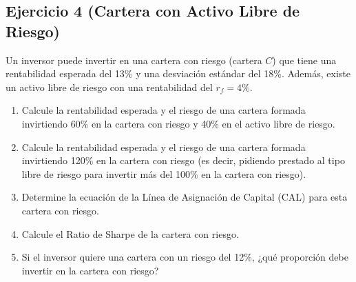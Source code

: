 \documentclass[12pt,a4paper]{article}
\newenvironment{ejercicio}[1]{\subsection*{Ejercicio #1}}{}
\begin{document}
\begin{ejercicio}{4 (Cartera con Activo Libre de Riesgo)}
Un inversor puede invertir en una cartera con riesgo (cartera $C$) que tiene una rentabilidad esperada del 13\% y una desviación estándar del 18\%. Además, existe un activo libre de riesgo con una rentabilidad del $r_f = 4\%$.

\begin{enumerate}[label=\alph*)]
  \item Calcule la rentabilidad esperada y el riesgo de una cartera formada invirtiendo 60\% en la cartera con riesgo y 40\% en el activo libre de riesgo.
  \item Calcule la rentabilidad esperada y el riesgo de una cartera formada invirtiendo 120\% en la cartera con riesgo (es decir, pidiendo prestado al tipo libre de riesgo para invertir más del 100\% en la cartera con riesgo).
  \item Determine la ecuación de la Línea de Asignación de Capital (CAL) para esta cartera con riesgo.
  \item Calcule el Ratio de Sharpe de la cartera con riesgo.
  \item Si el inversor quiere una cartera con un riesgo del 12\%, ¿qué proporción debe invertir en la cartera con riesgo?
\end{enumerate}
\end{ejercicio}
\end{document}
